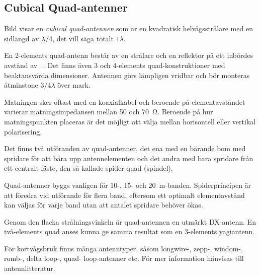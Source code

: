 \subsection{Cubical Quad-antenner}


Bild  visar en \emph{cubical quad-antennen} som är en
kvadratisk helvågsstrålare med en sidlängd av \(\lambda/4\), det vill säga
totalt \(1 \lambda\).

En 2-elements quad-antenn består av en strålare och en reflektor på ett inbördes
avstånd av ~\lambda.
Det finns även 3 och 4-elements quad-konstruktioner med beaktansvärda
dimensioner.
Antennen görs lämpligen vridbar och bör monteras åtminstone $3/4 \lambda$
över mark.

Matningen sker oftast med en koaxialkabel och beroende på elementavståndet
varierar matningsimpedansen mellan 50 och \SI{70}{\ohm}.
Beroende på hur matningspunkten placeras är det möjligt att välja mellan
horisontell eller vertikal polarisering.

Det finns två utföranden av quad-antenner, det ena med en bärande bom
med spridare för att bära upp antennelementen och det andra med bara
spridare från ett centralt fäste, den så kallade spider quad (spindel).

Quad-antenner byggs vanligen för 10-, 15- och \SI{20}{\metre}-banden.
Spiderprincipen är att föredra vid utförande för flera band, eftersom ett
optimalt element\-avstånd kan väljas för varje band utan att antalet spridare
behöver ökas.

Genom den flacka strålningsvinkeln är quad-\-an\-tennen en utmärkt DX-antenn.
En två-elements quad anses kunna ge samma resultat som en 3-elements yagiantenn.

För kortvågsbruk finns många antenntyper, såsom longwire-, zepp-,
windom-, romb-, delta loop-, quad- loop-antenner etc.
För mer information hänvisas till antennlitteratur.
